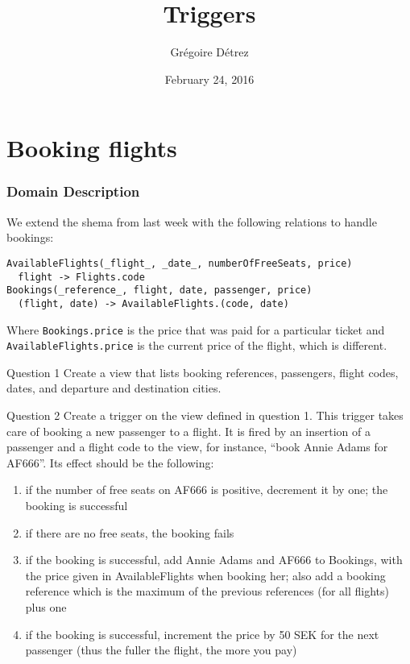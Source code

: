\documentclass{beamer}
\title[Tutorial 4]{Triggers}
\author{Gr\'egoire D\'etrez}
\date{February 24, 2016}
\begin{document}
\frame{\titlepage}


\section{Booking flights}
\frame{\sectionpage}

\begin{frame}[fragile]
  \frametitle{Domain Description}
  We extend the shema from last week with the following relations to handle
  bookings:
\footnotesize
\begin{verbatim}
AvailableFlights(_flight_, _date_, numberOfFreeSeats, price)
  flight -> Flights.code
Bookings(_reference_, flight, date, passenger, price)
  (flight, date) -> AvailableFlights.(code, date)
\end{verbatim}
\normalsize
Where \verb|Bookings.price| is the price that was paid for a particular ticket
and \verb|AvailableFlights.price| is the current price of the flight, which is
different.
\end{frame}

\begin{frame}{Question 1}
  Create a view that lists booking references, passengers, flight codes, dates,
  and departure and destination cities.
\end{frame}

\begin{frame}{Question 2}
  Create a trigger on the view defined in question 1. This trigger takes care
  of booking a new passenger to a flight. It is fired by an insertion of a
  passenger and a flight code to the view, for instance, ``book Annie Adams for
  AF666''. Its effect should be the following:
  \begin{enumerate}
    \item if the number of free seats on AF666 is positive, decrement it by
      one; the booking is successful
    \item if there are no free seats, the booking fails
    \item if the booking is successful, add Annie Adams and AF666 to Bookings,
      with the price given in AvailableFlights when booking her; also add a
      booking reference which is the maximum of the previous references (for
      all flights) plus one
    \item if the booking is successful, increment the price by 50 SEK for the
      next passenger (thus the fuller the flight, the more you pay)
  \end{enumerate}
\end{frame}
\end{document}
